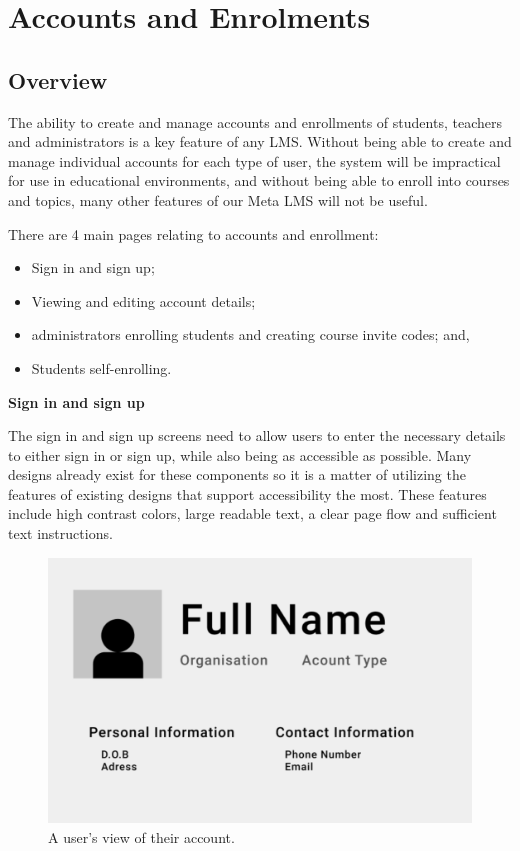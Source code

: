\section{Accounts and Enrolments}
\subsection{Overview}
The ability to create and manage accounts and enrollments of students, teachers and administrators is a key feature of any LMS. Without being able to create and manage individual accounts for each type of user, the system will be impractical for use in educational environments, and without being able to enroll into courses and topics, many other features of our Meta LMS will not be useful.

There are 4 main pages relating to accounts and enrollment:
\begin{itemize}
  \item Sign in and sign up;
  \item Viewing and editing account details;
  \item administrators enrolling students and creating course invite codes; and,
  \item Students self-enrolling.
\end{itemize}

\textbf{Sign in and sign up}

The sign in and sign up screens need to allow users to enter the necessary details to either sign in or sign up, while also being as accessible as possible. Many designs already exist for these components so it is a matter of utilizing the features of existing designs that support accessibility the most. These features include high contrast colors, large readable text, a clear page flow and sufficient text instructions.

\begin{figure}[h!]
  \centering
  \includegraphics[scale=0.2]{images/accounts-profile}
  \caption{A user's view of their account.}
\end{figure}

